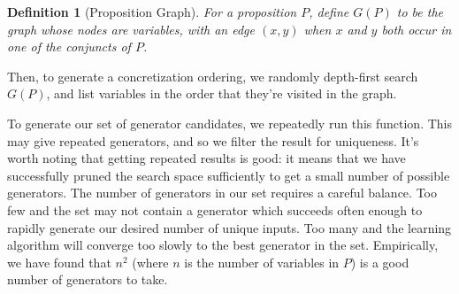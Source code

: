 \documentclass[sigconf,nonacm]{acmart}
\newtheorem{definition}{Definition}
\begin{document}
\begin{definition}[Proposition Graph]
For a proposition $P$, define $G(P)$ to be the graph whose nodes are variables, with an edge $(x,y)$ when $x$ and $y$ both occur in one of the conjuncts of $P$.
\end{definition}

Then, to generate a concretization ordering, we randomly depth-first search $G(P)$, and list variables in the order that they're visited in the graph.

      

      
      

To generate our set of generator candidates, we repeatedly run this function. This may give repeated generators, and so we filter the result for uniqueness. It's worth noting that getting repeated results is good: it means that we have successfully pruned the search space sufficiently to get a small number of possible generators. The number of generators in our set requires a careful balance. Too few and the set may not contain a generator which succeeds often enough to rapidly generate our desired number of unique inputs. Too many and the learning algorithm will converge too slowly to the best generator in the set. Empirically, we have found that $n^2$ (where $n$ is the number of variables in $P$) is a good number of generators to take.
\end{document}
